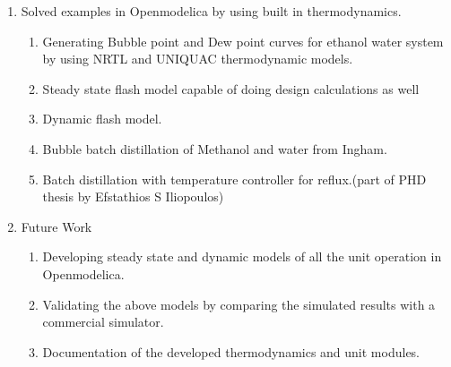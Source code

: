 \documentclass[12pt]{article}
\begin{document}
\begin{enumerate}
\item Solved examples in Openmodelica by using built in thermodynamics.
\begin{enumerate}[label*=\arabic*.]
\item Generating Bubble point and Dew point curves for ethanol water system by using NRTL and UNIQUAC thermodynamic models.
\item Steady state flash model capable of doing design calculations as well
\item Dynamic flash model.
\item Bubble batch distillation of Methanol and water from Ingham.
\item Batch distillation with temperature controller for reflux.(part of PHD thesis by Efstathios S Iliopoulos)
\end{enumerate}

\item Future Work
\begin{enumerate}[label*=\arabic*.]
\item Developing steady state and dynamic models of all the unit operation in Openmodelica.
\item Validating the above models by comparing the simulated results with a commercial simulator.
\item Documentation of the developed thermodynamics and unit modules.

\end{enumerate}
\end{enumerate}
\end{document}
